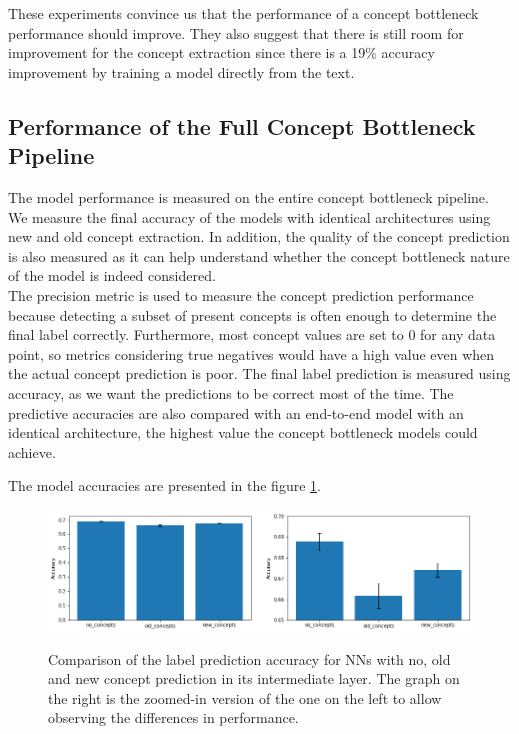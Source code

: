 These experiments convince us that the performance of a concept bottleneck performance should improve.
They also suggest that there is still room for improvement for the concept extraction since there is a 19\% accuracy improvement by training a model directly from the text.

\subsection{Performance of the Full Concept Bottleneck Pipeline}

The model performance is measured on the entire concept bottleneck pipeline.
We measure the final accuracy of the models with identical architectures using new and old concept extraction. 
In addition, the quality of the concept prediction is also measured as it can help understand whether the concept bottleneck nature of the model is indeed considered. \\
The precision metric is used to measure the concept prediction performance because detecting a subset of present concepts is often enough to determine the final label correctly.
Furthermore, most concept values are set to 0 for any data point, so metrics considering true negatives would have a high value even when the actual concept prediction is poor.
The final label prediction is measured using accuracy, as we want the predictions to be correct most of the time.
The predictive accuracies are also compared with an end-to-end model with an identical architecture, the highest value the concept bottleneck models could achieve.

The model accuracies are presented in the figure \ref{full-process-accuracy-comparison}.
\begin{figure}[h]
\caption{Comparison of the label prediction accuracy for NNs with no, old and new concept prediction in its intermediate layer. The graph on the right is the zoomed-in version of the one on the left to allow observing the differences in performance.}
\centering
\includegraphics[width=\textwidth]{concept-bottleneck-pipeline/accuracy_comparison.png}
\label{full-process-accuracy-comparison}
\end{figure}

